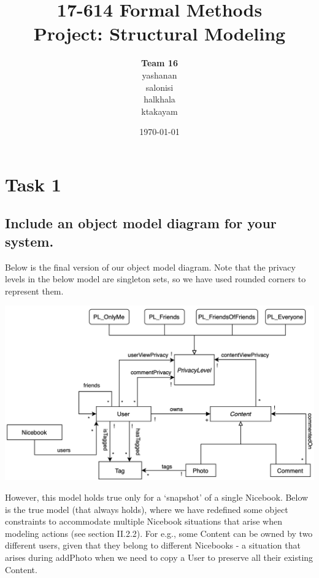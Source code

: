 \documentclass[titlepage]{article}
\begin{document}
\title{17-614 Formal Methods\\[1ex] Project: Structural Modeling}
\author{
	{\Large\textbf{Team 16}}\\[3ex]
	yashanan\\[1ex] salonisi\\[1ex] halkhala\\[1ex] ktakayam}
\date{\today}
\maketitle

\newpage

\section{Task 1}
\subsection{Include an object model diagram for your system.}

Below is the final version of our object model diagram. Note that the privacy levels in the below model are singleton sets, so we have used rounded corners to represent them.

\includegraphics[width=6in]{images/single_model.png}

However, this model holds true only for a ‘snapshot’ of a single Nicebook. Below is the true model (that always holds), where we have redefined some object constraints to accommodate multiple Nicebook situations that arise when modeling actions (see section II.2.2). For e.g., some Content can be owned by two different users, given that they belong to different Nicebooks - a situation that arises during addPhoto when we need to copy a User to preserve all their existing Content.
\end{document}
